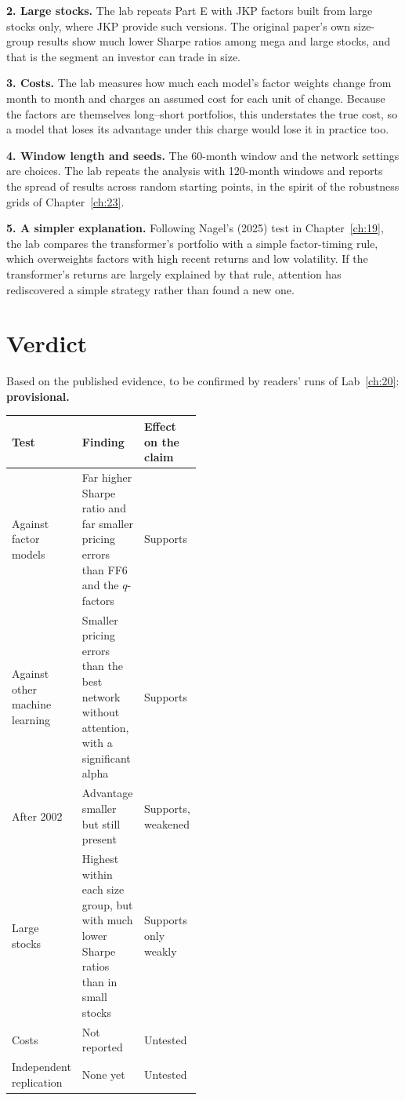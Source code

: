 \textbf{2. Large stocks.} The lab repeats Part E with JKP factors built from large stocks only, where JKP provide such versions. The original paper's own size-group results show much lower Sharpe ratios among mega and large stocks, and that is the segment an investor can trade in size.

\textbf{3. Costs.} The lab measures how much each model's factor weights change from month to month and charges an assumed cost for each unit of change. Because the factors are themselves long--short portfolios, this understates the true cost, so a model that loses its advantage under this charge would lose it in practice too.

\textbf{4. Window length and seeds.} The 60-month window and the network settings are choices. The lab repeats the analysis with 120-month windows and reports the spread of results across random starting points, in the spirit of the robustness grids of Chapter~\ref{ch:23}.

\textbf{5. A simpler explanation.} Following Nagel's (2025) test in Chapter~\ref{ch:19}, the lab compares the transformer's portfolio with a simple factor-timing rule, which overweights factors with high recent returns and low volatility. If the transformer's returns are largely explained by that rule, attention has rediscovered a simple strategy rather than found a new one.

\section{Verdict}
\label{sec:20-verdict}

Based on the published evidence, to be confirmed by readers' runs of Lab~\ref{ch:20}: \textbf{provisional.}

\begin{center}
\small
\begin{tabularx}{0.9\linewidth}{@{}>{\raggedright\arraybackslash}p{0.24\linewidth}>{\raggedright\arraybackslash}X>{\raggedright\arraybackslash}p{0.24\linewidth}@{}}
\toprule
Test & Finding & Effect on the claim \\
\midrule
Against factor models & Far higher Sharpe ratio and far smaller pricing errors than FF6 and the $q$-factors & Supports \\
Against other machine learning & Smaller pricing errors than the best network without attention, with a significant alpha & Supports \\
After 2002 & Advantage smaller but still present & Supports, weakened \\
Large stocks & Highest within each size group, but with much lower Sharpe ratios than in small stocks & Supports only weakly \\
Costs & Not reported & Untested \\
Independent replication & None yet & Untested \\
\bottomrule
\end{tabularx}
\end{center}

